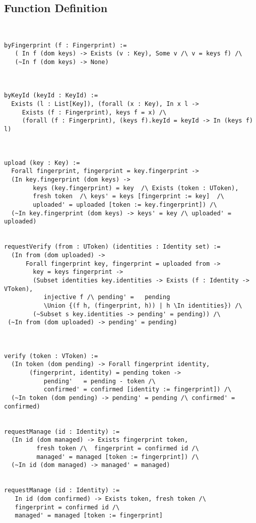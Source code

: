 \documentclass{article}
\begin{document}
\subsection{Function Definition}
\begin{verbatim}


byFingerprint (f : Fingerprint) := 
   ( In f (dom keys) -> Exists (v : Key), Some v /\ v = keys f) /\ 
   (~In f (dom keys) -> None) 
 


byKeyId (keyId : KeyId) :=
  Exists (l : List[Key]), (forall (x : Key), In x l -> 
     Exists (f : Fingerprint), keys f = x) /\
     (forall (f : Fingerprint), (keys f).keyId = keyId -> In (keys f) l)
      


upload (key : Key) := 
  Forall fingerprint, fingerprint = key.fingerprint -> 
  (In key.fingerprint (dom keys) -> 
        keys (key.fingerprint) = key  /\ Exists (token : UToken), 
        fresh token  /\ keys' = keys [fingerprint := key]  /\
        uploaded' = uploaded [token := key.fingerprint]) /\
  (~In key.fingerprint (dom keys) -> keys' = key /\ uploaded' = uploaded)  
         
        
requestVerify (from : UToken) (identities : Identity set) :=
  (In from (dom uploaded) -> 
      Forall fingerprint key, fingerprint = uploaded from -> 
        key = keys fingerprint -> 
        (Subset identities key.identities -> Exists (f : Identity -> VToken), 
           injective f /\ pending' =   pending 
           \Union {(f h, (fingerprint, h)) | h \In identities}) /\
        (~Subset s key.identities -> pending' = pending)) /\
 (~In from (dom uploaded) -> pending' = pending)



verify (token : VToken) :=
  (In token (dom pending) -> Forall fingerprint identity,
       (fingerprint, identity) = pending token -> 
           pending'   = pending - token /\        
           confirmed' = confirmed [identity := fingerprint]) /\
  (~In token (dom pending) -> pending' = pending /\ confirmed' = confirmed)


requestManage (id : Identity) :=
  (In id (dom managed) -> Exists fingerprint token, 
         fresh token /\  fingerprint = confirmed id /\
         managed' = managed [token := fingerprint]) /\
  (~In id (dom managed) -> managed' = managed)
   

requestManage (id : Identity) :=
   In id (dom confirmed) -> Exists token, fresh token /\
   fingerprint = confirmed id /\
   managed' = managed [token := fingerprint]




\end{verbatim}
\end{document}

